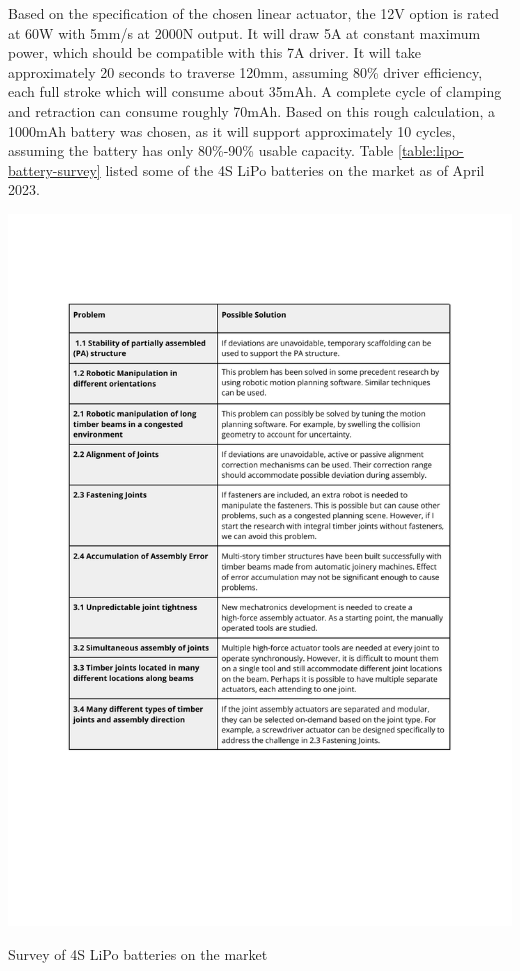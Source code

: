 Based on the specification of the chosen linear actuator, the 12V option is rated at 60W with 5mm/s at 2000N output. It will draw 5A at constant maximum power, which should be compatible with this 7A driver. It will take approximately 20 seconds to traverse 120mm, assuming 80\% driver efficiency, each full stroke which will consume about 35mAh. A complete cycle of clamping and retraction can consume roughly 70mAh. Based on this rough calculation, a 1000mAh battery was chosen, as it will support approximately 10 cycles, assuming the battery has only 80\%-90\% usable capacity.
Table \ref{table:lipo-battery-survey} listed some of the 4S LiPo batteries on the market as of April 2023.

\begin{table}[]
    \includegraphics[page=6, trim=25.4mm 210mm 25.4mm 33mm, clip, width=\textwidth]{tables/Tables in Chapter 4.pdf}
    \caption{Survey of 4S LiPo batteries on the market}
    \label{table:lipo-battery-survey}
\end{table}

